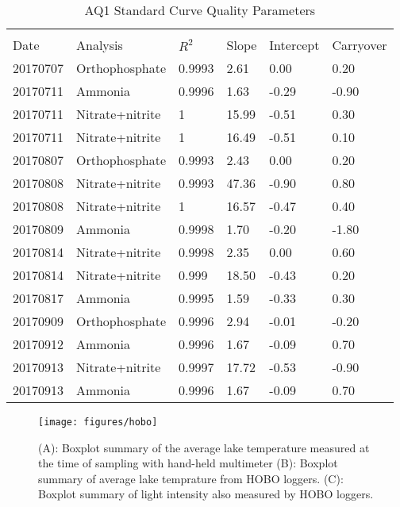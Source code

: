 \begin{table}[]
	\caption{AQ1 Standard Curve Quality Parameters}
	\label{tab:aq1}
	\begin{center}
\begin{tabular}{llllll} 
	\hline \\
Date     & Analysis 		& $R^2$  & Slope & Intercept & Carryover \\ \hline
20170707 & Orthophosphate 	& 0.9993 & 2.61  & 0.00      & 0.20      \\
20170711 & Ammonia  		& 0.9996 & 1.63  & -0.29     & -0.90     \\
20170711 & Nitrate+nitrite 	& 1      & 15.99 & -0.51     & 0.30      \\
20170711 & Nitrate+nitrite 	& 1      & 16.49 & -0.51     & 0.10      \\
20170807 & Orthophosphate 	& 0.9993 & 2.43  & 0.00      & 0.20      \\
20170808 & Nitrate+nitrite 	& 0.9993 & 47.36 & -0.90     & 0.80      \\
20170808 & Nitrate+nitrite	& 1      & 16.57 & -0.47     & 0.40      \\
20170809 & Ammonia   		& 0.9998 & 1.70  & -0.20     & -1.80     \\
20170814 & Nitrate+nitrite 	& 0.9998 & 2.35  & 0.00      & 0.60      \\
20170814 & Nitrate+nitrite 	& 0.999  & 18.50 & -0.43     & 0.20      \\
20170817 & Ammonia  		& 0.9995 & 1.59  & -0.33     & 0.30      \\
20170909 & Orthophosphate 	& 0.9996 & 2.94  & -0.01     & -0.20     \\
20170912 & Ammonia  		& 0.9996 & 1.67  & -0.09     & 0.70      \\
20170913 & Nitrate+nitrite 	& 0.9997 & 17.72 & -0.53     & -0.90     \\
20170913 & Ammonia 		& 0.9996 & 1.67  & -0.09     & 0.70      \\ \hline      
\end{tabular}
\end{center}
\end{table}

\begin{figure}
\texttt{[image: figures/hobo]}
\caption{
(A): Boxplot summary of the average lake temperature measured at the time of sampling with hand-held multimeter 
(B): Boxplot summary of average lake temprature from HOBO loggers. 
(C): Boxplot summary of light intensity also measured by HOBO loggers.
} 
\label{fig:hobo}
\end{figure}


